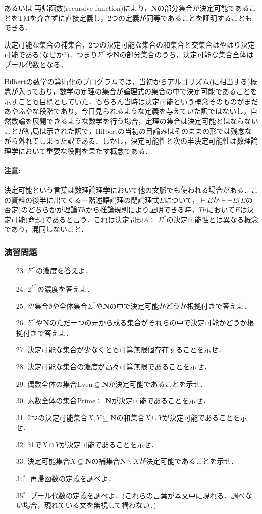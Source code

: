 \documentclass{ltjsarticle}
\theoremstyle{mystyle1}
\theoremstyle{mystyle2}
\newcommand{\bN}{\ensuremath{\mathbf{N}}}
\newcommand{\red}[1]{{\color{red} #1}}
\begin{document}
あるいは\red{再帰函数}(recursive function)により，$\bN$の部分集合が決定可能であることをTMを介さずに直接定義し，2つの定義が同等であることを証明することもできる．

決定可能な集合の補集合，2つの決定可能な集合の和集合と交集合はやはり決定可能である(なぜか?)．つまり$\Sigma^\ast$や$\bN$の部分集合のうち，決定可能な集合全体は\red{ブール代数}となる．

Hilbertの数学の算術化のプログラムでは，当初からアルゴリズム(に相当する)概念が入っており，数学の定理の集合が論理式の集合の中で決定可能であることを示すことも目標としていた．もちろん当時は決定可能という概念そのものがまだあやふやな段階であり，今日見られるような定義を与えていた訳ではないし，自然数論を展開できるような数学を行う場合，定理の集合は決定可能とはならないことが結局は示された訳で，Hilbertの当初の目論みはそのままの形では残念ながら外れてしまった訳である．しかし，決定可能性と次の半決定可能性は数理論理学において重要な役割を果たす概念である．
\paragraph{注意:}
決定可能という言葉は数理論理学において他の文脈でも使われる場合がある．この資料の後半に出てくる一階述語論理の閉論理式$E$について，$\vdash E$か$\vdash\neg E$($E$の否定)のどちらかが理論$Th$から推論規則により証明できる時，$Th$において$E$は決定可能(命題)であると言う．これは決定問題$A\subseteq\Sigma^\ast$の決定可能性とは異なる概念であり，混同しないこと．
\subsubsection*{演習問題}
\begin{enumerate}
  \item[23.] $\Sigma^\ast$の濃度を答えよ．
  \item[24.] $2^{\Sigma^\ast}$の濃度を答えよ．
  \item[25.] 空集合$\emptyset$や全体集合$\Sigma^\ast$や$\bN$の中で決定可能かどうか根拠付きで答えよ．
  \item[26.] $\Sigma^\ast$や$\bN$のただ一つの元から成る集合がそれらの中で決定可能かどうか根拠付きで答えよ．
  \item[27.] 決定可能な集合が少なくとも可算無限個存在することを示せ．
  \item[28.] 決定可能な集合の濃度が高々可算無限であることを示せ．
  \item[29.] 偶数全体の集合$\mathrm{Even}\subseteq\bN$が決定可能であることを示せ．
  \item[30.] 素数全体の集合$\mathrm{Prime}\subseteq\bN$が決定可能であることを示せ．
  \item[31.] 2つの決定可能集合$X,Y\subseteq\bN$の和集合$X\cup Y$が決定可能であることを示せ．
  \item[32.] 31で$X\cap Y$が決定可能であることを示せ．
  \item[33.] 決定可能集合$X\subseteq\bN$の補集合$\bN\backslash X$が決定可能であることを示せ．
  \item[34$^\ast$.] 再帰函数の定義を調べよ．
  \item[35$^\ast$.] ブール代数の定義を調べよ．(これらの言葉が本文中に現れる．調べない場合，現れている文を無視して構わない．)
\end{enumerate}
\end{document}
